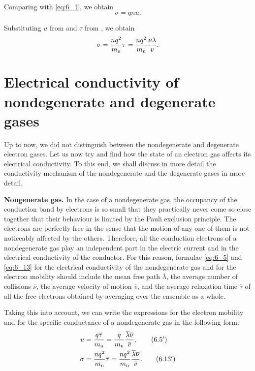 \noindent
Comparing  with \eqref{eq:6_1}, we obtain
\begin{equation}\label{eq:6_12}
    \sigma = qnu.
\end{equation}

\noindent
Substituting $u$ from  and $\tau$ from , we obtain
\begin{equation}\label{eq:6_13}
    \sigma = \frac{n q^2}{m_{\text{n}}} \tau = \frac{n q^2}{m_{\text{n}}} \frac{\nu \lambda}{v}.
\end{equation}

\section{Electrical conductivity of nondegenerate
and degenerate gases}\label{sec:51}

Up to now, we did not distinguish between the nondegenerate and degenerate electron gases. Let us now try and find how the state of an electron gas affects its electrical conductivity. To this end, we shall discuss in more detail the conductivity mechanism of the nondegenerate and the degenerate gases in more detail.

\textbf{Nongenerate gas.} In the case of a nondegenerate gas, the occupancy of the conduction band by electrons is so small that they practically never come so close together that their behaviour is limited by the Pauli exclusion principle. The electrons are perfectly free in the sense that the motion of any one of them is not noticeably affected by the others. Therefore, all the conduction electrons of a nondegenerate gas play an independent part in the electric current and in the electrical conductivity of the conductor. For this reason, formulae \eqref{eq:6_5}
and \eqref{eq:6_13} for the electrical conductivity of the nondegenerate gas and for the electron mobility should include the mean free path $\overline{\lambda}$, the average number of collisions $\overline{\nu}$, the average velocity of motion $\overline{v}$, and the average relaxation time $\overline{\tau}$ of all the free electrons obtained by averaging over the ensemble as a whole.

Taking this into account, we can write the expressions for the electron mobility and for the specific conductance of a nondegenerate gas in the following form:
\begin{align}
    u &= \frac{q \overline{\tau}}{m_{\text{n}}} = \frac{q}{m_{\text{n}}} \frac{\overline{\lambda} \overline{\nu}}{\overline{v}},\tag{6.5$'$}\label{eq:6_5p}\\
    \sigma &= \frac{n q^2}{m_{\text{n}}} \overline{\tau} = \frac{n q^2}{m_{\text{n}}} \frac{\overline{\lambda} \overline{\nu}}{\overline{v}}.\tag{6.13$'$}\label{eq:6_13p}
\end{align}


